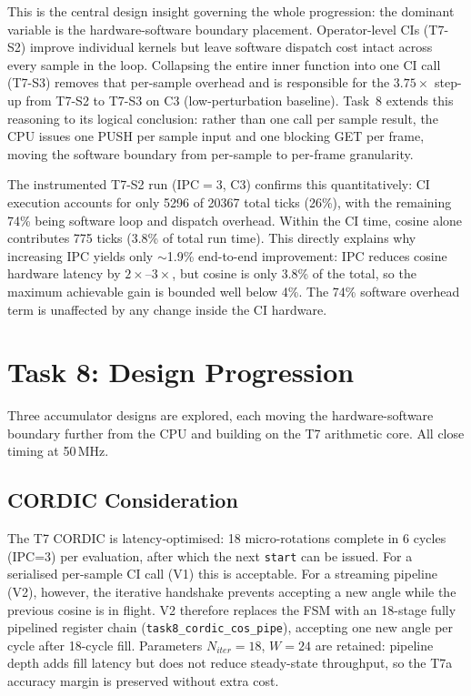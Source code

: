 \documentclass[a4paper,10pt,twocolumn]{article}
\begin{document}
This is the central design insight governing the whole progression: the dominant variable is the hardware-software boundary placement. Operator-level CIs (T7-S2) improve individual kernels but leave software dispatch cost intact across every sample in the loop. Collapsing the entire inner function into one CI call (T7-S3) removes that per-sample overhead and is responsible for the $3.75\times$ step-up from T7-S2 to T7-S3 on C3 (low-perturbation baseline). Task~8 extends this reasoning to its logical conclusion: rather than one call per sample result, the CPU issues one PUSH per sample input and one blocking GET per frame, moving the software boundary from per-sample to per-frame granularity.

The instrumented T7-S2 run (IPC$=3$, C3) confirms this quantitatively: CI execution accounts for only 5296 of 20367 total ticks (26\%), with the remaining 74\% being software loop and dispatch overhead. Within the CI time, cosine alone contributes 775 ticks (3.8\% of total run time). This directly explains why increasing IPC yields only $\sim$1.9\% end-to-end improvement: IPC reduces cosine hardware latency by $2\times$--$3\times$, but cosine is only 3.8\% of the total, so the maximum achievable gain is bounded well below 4\%. The 74\% software overhead term is unaffected by any change inside the CI hardware.

\section{Task 8: Design Progression}

Three accumulator designs are explored, each moving the hardware-software boundary further from the CPU and building on the T7 arithmetic core. All close timing at 50\,MHz.

\subsection{CORDIC Consideration}
The T7 CORDIC is latency-optimised: 18 micro-rotations complete in 6 cycles (IPC=3) per evaluation, after which the next \texttt{start} can be issued. For a serialised per-sample CI call (V1) this is acceptable. For a streaming pipeline (V2), however, the iterative handshake prevents accepting a new angle while the previous cosine is in flight. V2 therefore replaces the FSM with an 18-stage fully pipelined register chain (\texttt{task8\_cordic\_cos\_pipe}), accepting one new angle per cycle after 18-cycle fill. Parameters $N_{iter}{=}18$, $W{=}24$ are retained: pipeline depth adds fill latency but does not reduce steady-state throughput, so the T7a accuracy margin is preserved without extra cost.
\end{document}
